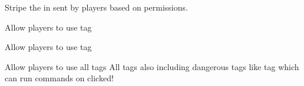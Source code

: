 Stripe the  in  sent by players based on permissions.\\

\begin{example}{Allow players to use  tag}
\end{example}

\begin{example}{Allow players to use  tag}
\end{example}

\begin{example}{Allow players to use all tags}
    All tags also including dangerous tags like  tag which can run commands on clicked!\\
\end{example}
